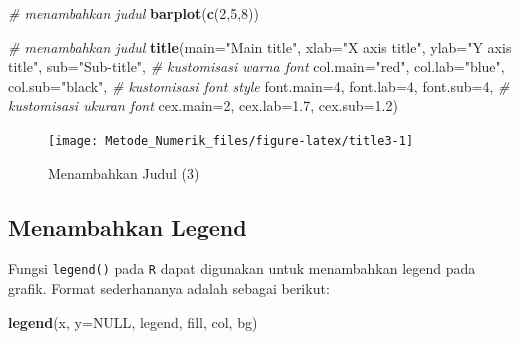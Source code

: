 \documentclass[
]{book}
\newenvironment{Shaded}{\begin{snugshade}}{\end{snugshade}}
\newcommand{\AttributeTok}[1]{\textcolor[rgb]{0.13,0.29,0.53}{#1}}
\newcommand{\CommentTok}[1]{\textcolor[rgb]{0.56,0.35,0.01}{\textit{#1}}}
\newcommand{\ConstantTok}[1]{\textcolor[rgb]{0.56,0.35,0.01}{#1}}
\newcommand{\DecValTok}[1]{\textcolor[rgb]{0.00,0.00,0.81}{#1}}
\newcommand{\FloatTok}[1]{\textcolor[rgb]{0.00,0.00,0.81}{#1}}
\newcommand{\FunctionTok}[1]{\textcolor[rgb]{0.13,0.29,0.53}{\textbf{#1}}}
\newcommand{\NormalTok}[1]{#1}
\newcommand{\StringTok}[1]{\textcolor[rgb]{0.31,0.60,0.02}{#1}}
\theoremstyle{definition}
\theoremstyle{definition}
\theoremstyle{definition}
\theoremstyle{definition}
\theoremstyle{remark}
\begin{document}
\begin{Shaded}
\begin{Highlighting}[]
\CommentTok{\# menambahkan judul}
\FunctionTok{barplot}\NormalTok{(}\FunctionTok{c}\NormalTok{(}\DecValTok{2}\NormalTok{,}\DecValTok{5}\NormalTok{,}\DecValTok{8}\NormalTok{))}

\CommentTok{\# menambahkan judul}
\FunctionTok{title}\NormalTok{(}\AttributeTok{main=}\StringTok{"Main title"}\NormalTok{,}
      \AttributeTok{xlab=}\StringTok{"X axis title"}\NormalTok{,}
      \AttributeTok{ylab=}\StringTok{"Y axis title"}\NormalTok{,}
      \AttributeTok{sub=}\StringTok{"Sub{-}title"}\NormalTok{,}
      \CommentTok{\# kustomisasi warna font}
      \AttributeTok{col.main=}\StringTok{"red"}\NormalTok{, }
      \AttributeTok{col.lab=}\StringTok{"blue"}\NormalTok{, }
      \AttributeTok{col.sub=}\StringTok{"black"}\NormalTok{,}
      \CommentTok{\# kustomisasi font style}
      \AttributeTok{font.main=}\DecValTok{4}\NormalTok{, }
      \AttributeTok{font.lab=}\DecValTok{4}\NormalTok{, }
      \AttributeTok{font.sub=}\DecValTok{4}\NormalTok{,}
      \CommentTok{\# kustomisasi ukuran font}
      \AttributeTok{cex.main=}\DecValTok{2}\NormalTok{, }
      \AttributeTok{cex.lab=}\FloatTok{1.7}\NormalTok{, }
      \AttributeTok{cex.sub=}\FloatTok{1.2}\NormalTok{)}
\end{Highlighting}
\end{Shaded}

\begin{figure}

{\centering \texttt{[image: Metode\_Numerik\_files/figure-latex/title3-1]} 

}

\caption{Menambahkan Judul (3)}\label{fig:title3}
\end{figure}

\hypertarget{addlegend}{%
\subsection{Menambahkan Legend}\label{addlegend}}

Fungsi \texttt{legend()} pada \texttt{R} dapat digunakan untuk menambahkan legend pada grafik. Format sederhananya adalah sebagai berikut:

\begin{Shaded}
\begin{Highlighting}[]
\FunctionTok{legend}\NormalTok{(x, }\AttributeTok{y=}\ConstantTok{NULL}\NormalTok{, legend, fill, col, bg)}
\end{Highlighting}
\end{Shaded}
\end{document}
